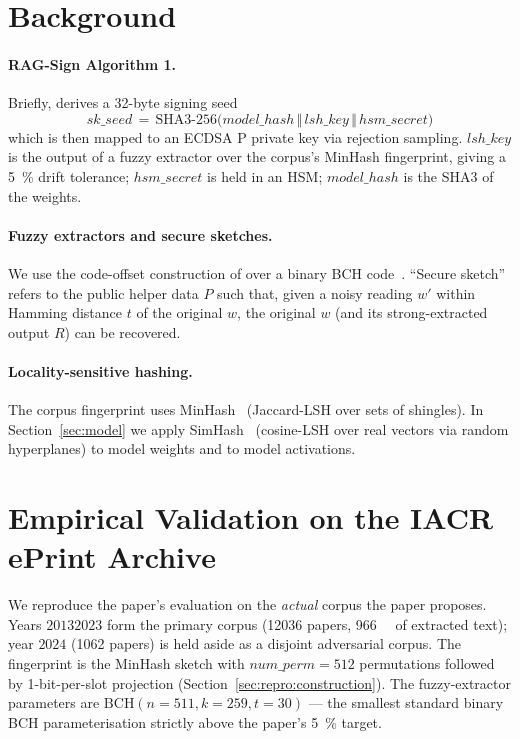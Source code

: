 \documentclass[11pt,a4paper]{article}
\begin{document}
\section{Background}
\label{sec:background}

\paragraph{RAG\nobreakdash-Sign Algorithm 1.}  Briefly,
\cite{holmes2025ragsign} derives a 32\nobreakdash-byte signing seed
\[
  \mathit{sk\_seed} \,=\, \mathrm{SHA3\text{-}256}\bigl(
    \mathit{model\_hash} \,\Vert\,
    \mathit{lsh\_key}    \,\Vert\,
    \mathit{hsm\_secret}
  \bigr)
\]
which is then mapped to an ECDSA P private key via
rejection sampling.  $\mathit{lsh\_key}$ is the output of a
fuzzy extractor over the corpus's MinHash fingerprint, giving a
\SI{5}{\percent} drift tolerance; $\mathit{hsm\_secret}$ is held in
an HSM; $\mathit{model\_hash}$ is the SHA3 of the
weights.

\paragraph{Fuzzy extractors and secure sketches.}  We use the
code\nobreakdash-offset construction of \cite{dodis2008fuzzy} over a
binary BCH code~\cite{macwilliams1977ecc}.  ``Secure sketch'' refers
to the public helper data $P$ such that, given a noisy reading $w'$
within Hamming distance $t$ of the original $w$, the original $w$
(and its strong\nobreakdash-extracted output $R$) can be recovered.

\paragraph{Locality\nobreakdash-sensitive hashing.}  The corpus
fingerprint uses MinHash~\cite{broder1997minhash} (Jaccard\nobreakdash-LSH
over sets of shingles).  In Section~\ref{sec:model} we apply
SimHash~\cite{charikar2002simhash} (cosine\nobreakdash-LSH over real
vectors via random hyperplanes) to model weights and to model
activations.

\section{Empirical Validation on the IACR ePrint Archive}
\label{sec:repro}

We reproduce the paper's evaluation on the \emph{actual} corpus the
paper proposes.  Years $2013$\textendash$2023$ form the primary
corpus (\num{12036} papers, \SI{966}{\mega\byte} of extracted text);
year $2024$ (\num{1062} papers) is held aside as a disjoint
adversarial corpus.  The fingerprint is the MinHash sketch with
$\mathit{num\_perm} = 512$ permutations followed by 1\nobreakdash-bit\nobreakdash-per\nobreakdash-slot
projection (Section~\ref{sec:repro:construction}).  The
fuzzy\nobreakdash-extractor parameters are
$\mathrm{BCH}(n=511, k=259, t=30)$ — the smallest standard binary
BCH parameterisation strictly above the paper's
\SI{5}{\percent} target.
\end{document}
